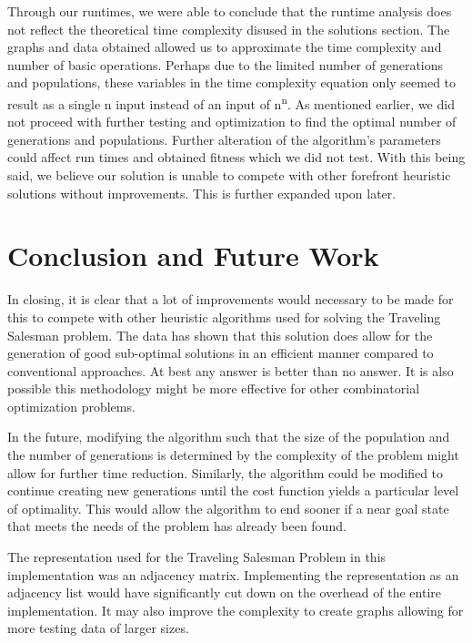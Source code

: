 \documentclass[sigplan,screen]{acmart}
\begin{document}
Through our runtimes, we were able to conclude that the runtime analysis does
not reflect the theoretical time complexity disused in the solutions section.
The graphs and data obtained allowed us to approximate the time complexity and
number of basic operations. Perhaps due to the limited number of generations and
populations, these variables in the time complexity equation only seemed to
result as a single n input instead of an input of n\textsuperscript{n}. As
mentioned earlier, we did not proceed with further testing and optimization to
find the optimal number of generations and populations. Further alteration of
the algorithm's parameters could affect run times and obtained fitness which we
did not test. With this being said, we believe our solution is unable to compete
with other forefront heuristic solutions without improvements. This is further
expanded upon later.

\section{Conclusion and Future Work}
In closing, it is clear that a lot of improvements would necessary to be made
for this to compete with other heuristic algorithms used for solving the
Traveling Salesman problem. The data has shown that this solution does allow for
the generation of good sub-optimal solutions in an efficient manner compared to
conventional approaches. At best any answer is better than no answer. It is also
possible this methodology might be more effective for other combinatorial
optimization problems.

In the future, modifying the algorithm such that the size of the population and
the number of generations is determined by the complexity of the problem might
allow for further time reduction. Similarly, the algorithm could be modified to
continue creating new generations until the cost function yields a particular
level of optimality. This would allow the algorithm to end sooner if a near goal
state that meets the needs of the problem has already been found.

The representation used for the Traveling Salesman Problem in this
implementation was an adjacency matrix. Implementing the representation as an
adjacency list would have significantly cut down on the overhead of the entire
implementation. It may also improve the complexity to create graphs allowing for
more testing data of larger sizes.
\end{document}
